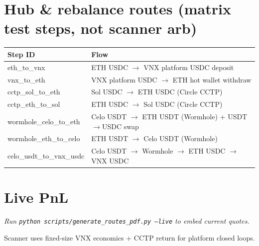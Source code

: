 \documentclass[11pt,a4paper]{article}
\begin{document}
\section*{Hub \& rebalance routes (matrix test steps, not scanner arb)}
\begin{tabular}{@{}ll@{}}
\toprule
Step ID & Flow \\
\midrule
eth\_to\_vnx & ETH USDC $\rightarrow$ VNX platform USDC deposit \\
vnx\_to\_eth & VNX platform USDC $\rightarrow$ ETH hot wallet withdraw \\
cctp\_sol\_to\_eth & Sol USDC $\rightarrow$ ETH USDC (Circle CCTP) \\
cctp\_eth\_to\_sol & ETH USDC $\rightarrow$ Sol USDC (Circle CCTP) \\
wormhole\_celo\_to\_eth & Celo USDT $\rightarrow$ ETH USDT (Wormhole) + USDT$\rightarrow$USDC swap \\
wormhole\_eth\_to\_celo & ETH USDT $\rightarrow$ Celo USDT (Wormhole) \\
celo\_usdt\_to\_vnx\_usdc & Celo USDT $\rightarrow$ Wormhole $\rightarrow$ ETH USDC $\rightarrow$ VNX USDC \\
\bottomrule
\end{tabular}
\section*{Live PnL}
\textit{Run \texttt{python scripts/generate\_routes\_pdf.py --live} to embed current quotes.}
\vfill
\begin{center}
\color{muted}\small Scanner uses fixed-size VNX economics + CCTP return for platform closed loops.
\end{center}
\end{document}
